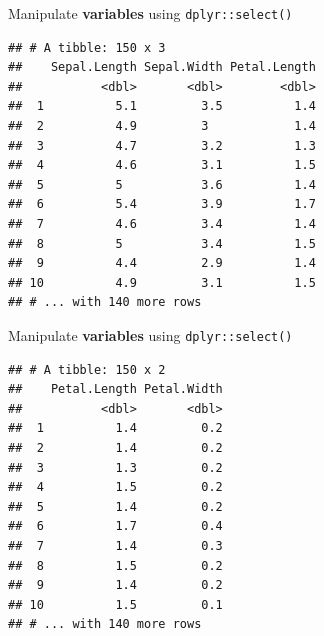 \documentclass[14pt,ignorenonframetext,]{bredelebeamer}
\newenvironment{Shaded}{\begin{snugshade}}{\end{snugshade}}
\newcommand{\KeywordTok}[1]{\textcolor[rgb]{0.94,0.87,0.69}{#1}}
\newcommand{\DecValTok}[1]{\textcolor[rgb]{0.86,0.86,0.80}{#1}}
\newcommand{\StringTok}[1]{\textcolor[rgb]{0.80,0.58,0.58}{#1}}
\newcommand{\OperatorTok}[1]{\textcolor[rgb]{0.94,0.94,0.82}{#1}}
\newcommand{\NormalTok}[1]{\textcolor[rgb]{0.80,0.80,0.80}{#1}}
\begin{document}
\begin{frame}[fragile]{Manipulate \textbf{variables} using
\texttt{dplyr::select()}}

\begin{Shaded}
\end{Shaded}

\begin{verbatim}
## # A tibble: 150 x 3
##    Sepal.Length Sepal.Width Petal.Length
##           <dbl>       <dbl>        <dbl>
##  1          5.1         3.5          1.4
##  2          4.9         3            1.4
##  3          4.7         3.2          1.3
##  4          4.6         3.1          1.5
##  5          5           3.6          1.4
##  6          5.4         3.9          1.7
##  7          4.6         3.4          1.4
##  8          5           3.4          1.5
##  9          4.4         2.9          1.4
## 10          4.9         3.1          1.5
## # ... with 140 more rows
\end{verbatim}

\end{frame}

\begin{frame}[fragile]{Manipulate \textbf{variables} using
\texttt{dplyr::select()}}

\begin{Shaded}
\end{Shaded}

\begin{verbatim}
## # A tibble: 150 x 2
##    Petal.Length Petal.Width
##           <dbl>       <dbl>
##  1          1.4         0.2
##  2          1.4         0.2
##  3          1.3         0.2
##  4          1.5         0.2
##  5          1.4         0.2
##  6          1.7         0.4
##  7          1.4         0.3
##  8          1.5         0.2
##  9          1.4         0.2
## 10          1.5         0.1
## # ... with 140 more rows
\end{verbatim}

\end{frame}
\end{document}
